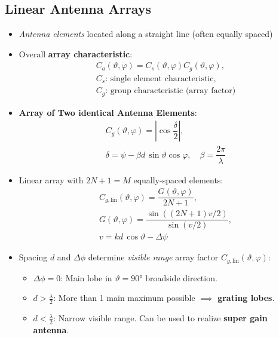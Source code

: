 \subsection{Linear Antenna Arrays}
\begin{itemize}
    \itemsep0pt
    \item \textit{Antenna elements} located along a straight line (often equally spaced)
    \item Overall \textbf{array characteristic}:
        \begin{align*}
            &C_a(\vartheta, \varphi) = C_s(\vartheta,\varphi) C_g(\vartheta,\varphi),\\
            &C_s\text{: single element characteristic},\\
            &C_g\text{: group characteristic (array factor)}
        \end{align*}
    \item \textbf{Array of Two identical Antenna Elements}:
        \begin{align*}
            &C_g(\vartheta,\varphi) = \left|\cos\dfrac\delta2\right|,\\
            &\delta = \psi - \beta d\,\sin\vartheta \cos\varphi, \quad \beta = \dfrac{2\pi}{\lambda}
        \end{align*}
    \item Linear array with $2N+1 = M$ equally-spaced elements:
        \begin{align*}
            &C_{g,\mathrm{lin}}(\vartheta,\varphi) = \dfrac{G(\vartheta,\varphi)}{2N+1},\\
            &G(\vartheta,\varphi) = \dfrac{\sin\left((2N+1)v/2\right)}{\sin\left(v/2\right)},\\
            &v = kd\,\cos\vartheta - \Delta\psi
        \end{align*}
    \item Spacing $d$ and $\Delta\phi$ determine \textit{visible range} array factor $C_{g,\mathrm{lin}}(\vartheta,\varphi)$:
        \begin{itemize}
            \itemsep0pt
            \item $\Delta\phi = 0$: Main lobe in $\vartheta = \ang{90}$ broadside direction.
            \item $d > \frac\lambda2$: More than 1 main maximum possible $\implies$ \textbf{grating lobes}.
            \item $d < \frac\lambda2$: Narrow visible range. Can be used to realize \textbf{super gain antenna}.
        \end{itemize}

\end{itemize}
